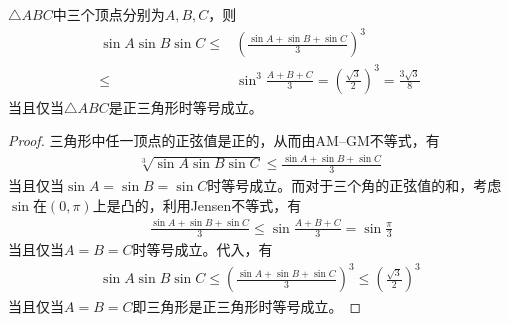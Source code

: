 \begin{theorem}
  $\triangle ABC$中三个顶点分别为$A,B,C$，则
  \begin{align*}
    \sin A \sin B \sin C \le{}& \left(\frac{\sin A + \sin B + \sin C}3\right)^3\\
                         \le{}& \sin^3\frac{A+B+C}3 = \left(\frac{\sqrt3}{2}\right)^3 = \frac{3\sqrt3}{8}    
  \end{align*}
  当且仅当$\triangle ABC$是正三角形时等号成立。
\end{theorem}
\begin{proof}
  三角形中任一顶点的正弦值是正的，从而由AM--GM不等式，有
  \begin{align*}
    \sqrt[3]{\sin A \sin B \sin C} \le \frac{\sin A + \sin B + \sin C}{3} 
  \end{align*}
  当且仅当$\sin A=\sin B=\sin C$时等号成立。而对于三个角的正弦值的和，考虑$\sin$在$(0,\pi)$上是凸的，利用Jensen不等式，有
  \begin{align*}
         && \frac{\sin A + \sin B + \sin C}{3} \le \sin \frac{A + B + C}{3} = \sin \frac{\pi}{3}
  \end{align*}
  当且仅当$A = B = C$时等号成立。代入，有
  \begin{align*}
    \sin A \sin B \sin C \le \left( \frac{\sin A + \sin B + \sin C}{3} \right)^3 \le \left( \frac{\sqrt3}{2} \right)^3
  \end{align*}
  当且仅当$A=B=C$即三角形是正三角形时等号成立。


\end{proof}
